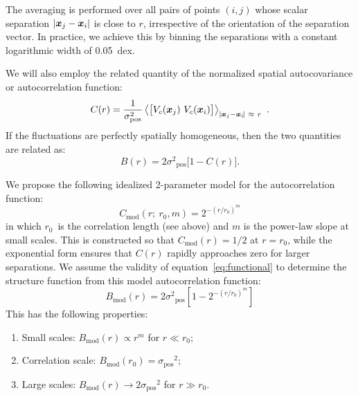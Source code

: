 \documentclass[fleqn,usenatbib, useAMS, a4paper]{mnras}
\newcommand\pos{\ensuremath{_{\mathrm{pos}}}}
\newcommand\model{\ensuremath{_{\mathrm{mod}}}}
\newcommand\xx{\ensuremath{\boldsymbol{x}}}
\begin{document}
The averaging is performed over all pairs of points
\((i, j)\)
whose scalar separation \(\Abs{\xx_j - \xx_i}\) is close to \(r\),
irrespective of the orientation of the separation vector.
In practice, we achieve this by binning the separations with a constant
logarithmic width of \SI{0.05}{dex}.

We will also employ the related quantity of the
normalized spatial autocovariance or autocorrelation function:
\begin{equation}
  \label{eq:autocovar}
  C(r) = \frac{1}{\sigma^2\pos}\left\langle 
  \bigl[
  V_{c}(\xx_j) \  V_{c}(\xx_i)
  \bigr] \right \rangle_{\Abs{\xx_j - \xx_i\!} \ \approx \ r} \ .
\end{equation}
If the fluctuations are perfectly spatially homogeneous, then the
two quantities are related \citep{1984ApJ...277..556S} as:
\begin{equation}\label{eq:functional}
  B(r) = 2\sigma^2\pos \bigl[   1 - C(r)\bigr] .
\end{equation}



We  propose the following idealized 2-parameter model
for the autocorrelation function:
%
\begin{equation}\label{eq:new-correlation-form}
  C\model(r;\ r_0, m) = 2^{- \left( r/r_0 \right)^m} 
\end{equation}
%
in which \(r_{0}\)\ is the correlation length (see above)
and \(m\) is the power-law slope at small scales.
This is constructed so that \(C\model(r) = 1/2\) at \(r = r_0\),
while the exponential form ensures that \(C(r)\) rapidly approaches zero
for larger separations.
We assume the validity of equation~\eqref{eq:functional} to determine the structure function
from this model autocorrelation function:
\begin{equation}
  \label{eq:model-strucfunc-ideal}
  B\model(r) = 2\sigma^2\pos \left[
    1 - 2^{- \left( r/r_0 \right)^m} 
  \right]
\end{equation}
This has the following properties:
\begin{enumerate}[1.]
 \item Small scales: \(B\model(r) \propto r^m\) for \(r \ll r_0\);
 \item Correlation scale: \(B\model(r_0) = \sigma\pos^2\);
 \item Large scales: \(B\model(r) \to 2 \sigma\pos^2\) for \(r \gg r_0\).
 \end{enumerate}
\end{document}
